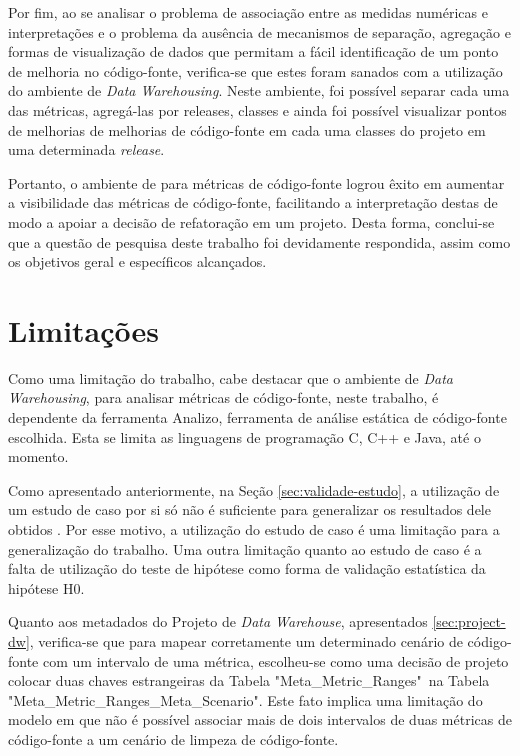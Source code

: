 Por fim, ao se analisar o problema de associação entre as medidas numéricas e interpretações e o problema da  ausência de mecanismos de separação, agregação e formas de visualização de dados que permitam a fácil identificação de um ponto de melhoria no código-fonte, verifica-se que estes foram sanados com a utilização do ambiente de \textit{Data Warehousing}. Neste ambiente, foi possível separar cada uma das métricas, agregá-las por releases, classes e ainda foi possível visualizar pontos de melhorias de melhorias de código-fonte em cada uma classes do projeto em uma determinada \textit{release}.   


Portanto, o ambiente de  para métricas de código-fonte logrou êxito em aumentar a visibilidade das métricas de código-fonte, facilitando a interpretação destas de modo a apoiar a decisão de refatoração em um projeto. Desta forma, conclui-se que a questão de pesquisa deste trabalho foi devidamente respondida, assim como os objetivos geral e específicos alcançados.


\section{Limitações}

Como uma limitação do trabalho, cabe destacar que o ambiente de \textit{Data Warehousing}, para analisar métricas de código-fonte, neste trabalho, é dependente da ferramenta Analizo, ferramenta de análise estática de código-fonte escolhida. Esta se limita as linguagens de programação C, C++ e Java, até o momento.

Como apresentado anteriormente, na Seção \ref{sec:validade-estudo}, a utilização de um estudo de caso por si só não é suficiente para generalizar os resultados dele obtidos \cite{yin2011applications}. Por esse motivo, a utilização do estudo de caso é uma limitação para a generalização do trabalho. Uma outra limitação quanto ao estudo de caso é a falta de utilização do teste de hipótese como forma de validação estatística da hipótese H0.

Quanto aos metadados do Projeto de \textit{Data Warehouse}, apresentados \ref{sec:project-dw}, verifica-se que para mapear corretamente um determinado cenário de código-fonte com um intervalo de uma métrica, escolheu-se como uma decisão de projeto colocar duas chaves estrangeiras da Tabela "Meta\_Metric\_Ranges"~na Tabela "Meta\_Metric\_Ranges\_Meta\_Scenario". Este fato implica uma limitação do modelo em que não é possível associar mais de dois intervalos de duas métricas de código-fonte a um cenário de limpeza de código-fonte.  

